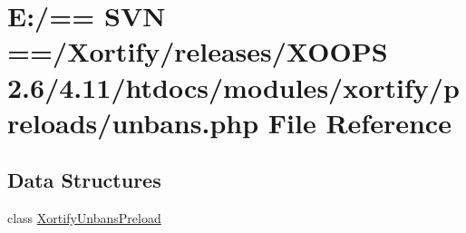\hypertarget{unbans_8php}{\section{E\-:/== S\-V\-N ==/\-Xortify/releases/\-X\-O\-O\-P\-S 2.6/4.11/htdocs/modules/xortify/preloads/unbans.php File Reference}
\label{unbans_8php}
}
\subsection*{Data Structures}
\begin{DoxyCompactItemize}
\item 
class \hyperlink{class_xortify_unbans_preload}{Xortify\-Unbans\-Preload}
\end{DoxyCompactItemize}
